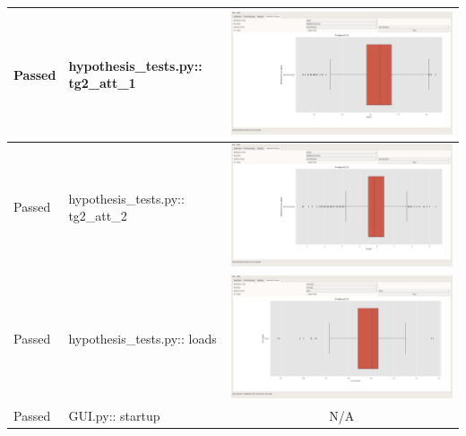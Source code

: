 \documentclass[11pt]{report}
\begin{document}
\begin{longtable}{|l|p{6.5cm}|C|}
\color{ForestGreen}Passed & hypothesis\_tests.py:: tg2\_att\_1 & \includegraphics[width=.9\linewidth]{./images/Screenshots/hypothesis_ttest_g2_att_1.png}\\
\hline
\color{ForestGreen}Passed & hypothesis\_tests.py:: tg2\_att\_2 & \includegraphics[width=.9\linewidth]{./images/Screenshots/hypothesis_ttest_g2_att_2.png}\\
\hline
\color{ForestGreen}Passed & hypothesis\_tests.py:: loads & \includegraphics[width=.9\linewidth]{./images/Screenshots/hypothesis_window_loads.png}\\
\hline
\color{ForestGreen}Passed & GUI.py:: startup & N/A\\

\end{longtable}
\end{document}
